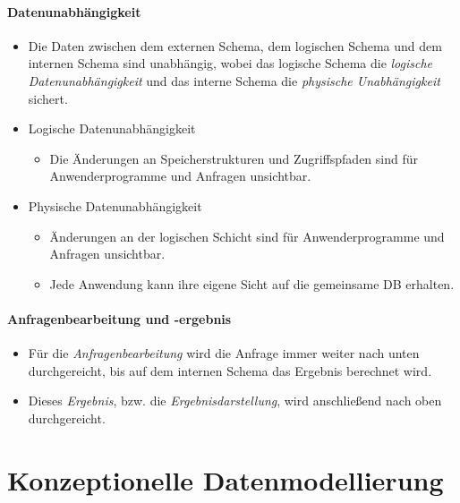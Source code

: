 \documentclass[a4paper, 11pt, accentcolor = tud3b]{tudreport}
\begin{document}
                \subsubsection{Datenunabhängigkeit} %
                    \begin{itemize}
                    	\item Die Daten zwischen dem externen Schema, dem logischen Schema und dem internen Schema sind unabhängig, wobei das logische Schema die \textit{logische Datenunabhängigkeit} und das interne Schema die \textit{physische Unabhängigkeit} sichert.
                    	\item Logische Datenunabhängigkeit
	                    	\begin{itemize}
	                    		\item Die Änderungen an Speicherstrukturen und Zugriffspfaden sind für Anwenderprogramme und Anfragen unsichtbar.
	                    	\end{itemize}
                    	\item Physische Datenunabhängigkeit
	                    	\begin{itemize}
	                    		\item Änderungen an der logischen Schicht sind für Anwenderprogramme und Anfragen unsichtbar.
	                    		\item Jede Anwendung kann ihre eigene Sicht auf die gemeinsame DB erhalten.
	                    	\end{itemize}
                    \end{itemize}

                \subsubsection{Anfragenbearbeitung und -ergebnis} %
                    \begin{itemize}
                    	\item Für die \textit{Anfragenbearbeitung} wird die Anfrage immer weiter nach unten durchgereicht, bis auf dem internen Schema das Ergebnis berechnet wird.
                    	\item Dieses \textit{Ergebnis}, bzw. die \textit{Ergebnisdarstellung}, wird anschließend nach oben durchgereicht.
                    \end{itemize}

    \chapter{Konzeptionelle Datenmodellierung} %
	    \label{c:concept_model}
\end{document}
